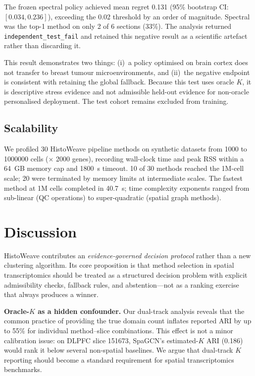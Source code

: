 \documentclass[]{bioinfo}
\begin{document}
The frozen spectral policy achieved mean regret 0.131 (95\% bootstrap
CI: $[0.034, 0.236]$), exceeding the 0.02 threshold by an order of
magnitude. Spectral was the top-1 method on only 2 of 6 sections (33\%).
The analysis returned \texttt{independent\_test\_fail} and
retained this negative result as a scientific artefact rather than
discarding it.

This result demonstrates two things: (i)~a policy optimised on brain
cortex does not transfer to breast tumour microenvironments, and
(ii)~the negative endpoint is consistent with retaining the global
fallback. Because this test uses oracle \(K\), it is descriptive stress
evidence and not admissible held-out evidence for non-oracle personalised
deployment. The test cohort remains excluded from training.

\subsection{Scalability}

We profiled 30 HistoWeave pipeline methods on synthetic datasets
from \num{1000} to \num{1000000} cells ($\times$ 2000 genes), recording
wall-clock time and peak RSS within a 64~GB memory cap and 1800~s
timeout. 10 of 30 methods reached the 1M-cell scale; 20 were
terminated by memory limits at intermediate scales. The fastest method
at 1M cells completed in 40.7~s; time complexity exponents ranged from
sub-linear (QC operations) to super-quadratic (spatial graph methods).

\section{Discussion}

HistoWeave contributes an \emph{evidence-governed decision protocol}
rather than a new clustering algorithm. Its core proposition is that
method selection in spatial transcriptomics should be treated as a
structured decision problem with explicit admissibility checks, fallback
rules, and abstention---not as a ranking exercise that always produces
a winner.

\textbf{Oracle-$K$ as a hidden confounder.}
Our dual-track analysis reveals that the common practice of providing
the true domain count inflates reported ARI by up to 55\% for individual
method--slice combinations. This effect is not a minor calibration
issue: on DLPFC slice 151673, SpaGCN's estimated-\(K\) ARI (0.186) would
rank it below several non-spatial baselines. We argue that dual-track
\(K\) reporting should become a standard requirement for spatial
transcriptomics benchmarks.
\end{document}
